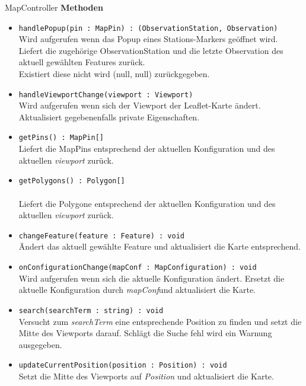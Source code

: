     \begin{Class}{MapController}
        \textbf{Methoden}
        \begin{itemize}
            \item \texttt{handlePopup(pin : MapPin) : (ObservationStation, Observation)}
            \\ Wird aufgerufen wenn das Popup eines Stations-Markers geöffnet wird.
            \\ Liefert die zugehörige ObservationStation und die letzte Observation des aktuell gewählten Features zurück.
            \\ Existiert diese nicht wird (null, null) zurückgegeben.
            \item \texttt{handleViewportChange(viewport : Viewport)}
            \\ Wird aufgerufen wenn sich der Viewport der Leaflet-Karte ändert.
            \\ Aktualisiert gegebenenfalls private Eigenschaften.
            \bigskip
            \item \texttt{getPins() : MapPin[]}
            \\ Liefert die MapPins entsprechend der aktuellen Konfiguration und des aktuellen \emph{viewport} zurück.
            \item \texttt{getPolygons() : Polygon[]}
            \\ \\ Liefert die Polygone entsprechend der aktuellen Konfiguration und des aktuellen \emph{viewport} zurück.
            \bigskip
            \item \texttt{changeFeature(feature : Feature) : void}
            \\ Ändert das aktuell gewählte Feature und aktualisiert die Karte entsprechend.
            \item \texttt{onConfigurationChange(mapConf : MapConfiguration) : void}
            \\ Wird aufgerufen wenn sich die aktuelle Konfiguration ändert. Ersetzt die aktuelle Konfiguration durch \emph{mapConf}und aktualisiert die Karte.
            \item \texttt{search(searchTerm : string) : void}
            \\ Versucht zum \emph{searchTerm} eine entsprechende Position zu finden und setzt die Mitte des Viewports darauf.
            Schlägt die Suche fehl wird ein Warnung ausgegeben.
            \item \texttt{updateCurrentPosition(position : Position) : void}
            \\ Setzt die Mitte des Viewports auf \emph{Position} und aktualisiert die Karte. 
        \end{itemize}
    \end{Class}

